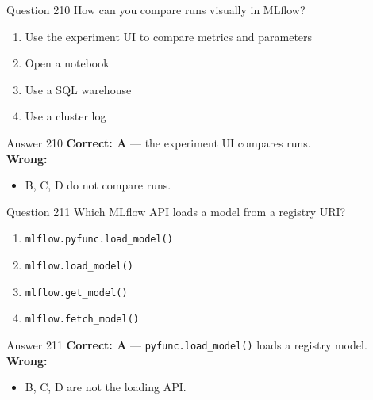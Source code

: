 \documentclass[aspectratio=169,11pt]{beamer}
\begin{document}
	\begin{frame}{Question 210}
		How can you compare runs visually in MLflow?
		\begin{enumerate}[label=\Alph*.]
			\item Use the experiment UI to compare metrics and parameters
			\item Open a notebook
			\item Use a SQL warehouse
			\item Use a cluster log
		\end{enumerate}
	\end{frame}
	\begin{frame}{Answer 210}
		\textbf{Correct: A} --- the experiment UI compares runs.\\
		\vspace{0.5em}
		\textbf{Wrong:}
		\begin{itemize}
			\item B, C, D do not compare runs.
		\end{itemize}
	\end{frame}
	
	\begin{frame}{Question 211}
		Which MLflow API loads a model from a registry URI?
		\begin{enumerate}[label=\Alph*.]
			\item \texttt{mlflow.pyfunc.load\_model()}
			\item \texttt{mlflow.load\_model()}
			\item \texttt{mlflow.get\_model()}
			\item \texttt{mlflow.fetch\_model()}
		\end{enumerate}
	\end{frame}
	\begin{frame}{Answer 211}
		\textbf{Correct: A} --- \texttt{pyfunc.load\_model()} loads a registry model.\\
		\vspace{0.5em}
		\textbf{Wrong:}
		\begin{itemize}
			\item B, C, D are not the loading API.
		\end{itemize}
	\end{frame}
	
\end{document}
